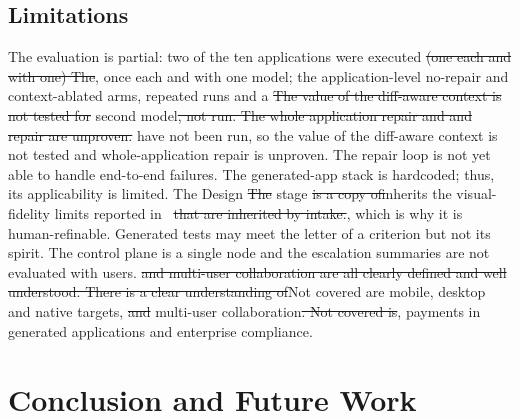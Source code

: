 \documentclass[pdflatex,sn-mathphys-num]{sn-jnl}%
\newcommand{\fix}[1]{{\color{fixcol}#1}}
\newcommand{\fixdel}[1]{{\color{fixcol}\sout{#1}}}
\newcommand{\rw}[2]{{\color{rwcol}#1}}%
\theoremstyle{thmstyleone}%
\theoremstyle{thmstyletwo}%
\theoremstyle{thmstylethree}%
\begin{document}
\subsection{Limitations}\label{sec9.4}

\rw{The evaluation is partial: two of the ten applications were executed\fixdel{ (one each and with one) The}\fix{, once each and with one model; the} application-level no-repair and context-ablated arms, repeated runs and a \fixdel{The value of the diff-aware context is not tested for} second model\fixdel{, not run. The whole application repair and and repair are unproven.}\fix{ have not been run, so the value of the diff-aware context is not tested and whole-application repair is unproven.} The repair loop is not yet able to handle end-to-end failures. The generated-app stack is hardcoded; thus, its applicability is limited. \fix{The} Design \fixdel{The} stage \fixdel{is a copy of}\fix{inherits} the visual-fidelity limits reported in~\cite{r23si}\fixdel{ that are inherited by intake.}\fix{, which is why it is} human-refinable. Generated tests may meet the letter of a criterion but not its spirit. The control plane is a single node and the escalation summaries are not evaluated with users. \fixdel{and multi-user collaboration are all clearly defined and well understood. There is a clear understanding of}\fix{Not covered are} mobile, desktop and native targets\fix{,} \fixdel{and} multi-user collaboration\fixdel{. Not covered is}\fix{,} payments in generated applications and enterprise compliance.}{The evaluation is partial: two of the ten applications were run, once each and with one model; the application-level no-repair and context-ablated arms, repeated runs and a second model have not been run, so the value of the diff-aware context is untested and whole-application repair is unproven. The repair loop cannot yet act on end-to-end failures. The generated-app stack is fixed, which restricts applicability. Design intake inherits the visual-fidelity limits reported in \cite{r23si}, which is why the stage is human-refinable. Generated tests can satisfy the letter of a criterion but not its intent. The control plane runs as a single node, and the escalation summaries have not been evaluated with users. Mobile, desktop and native targets, multi-user collaboration, payments in generated applications and enterprise compliance are outside the scope.}

\section{Conclusion and Future Work}\label{sec10}
\end{document}
